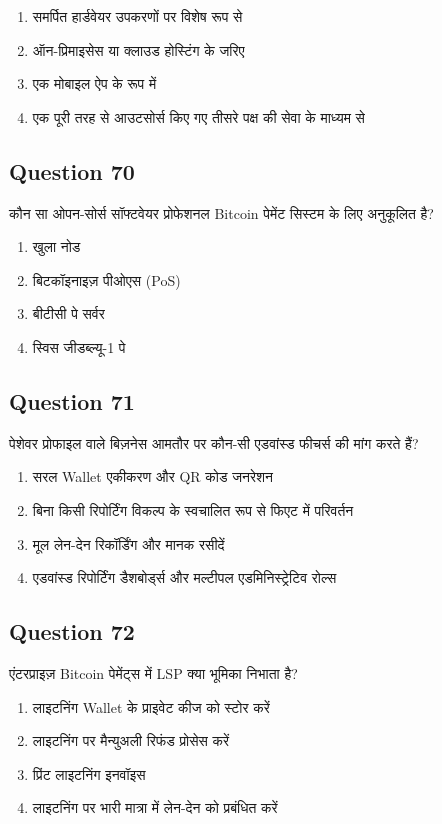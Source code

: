 \documentclass[12pt,a4paper]{article}
\begin{document}
\begin{enumerate}[label=\Alph*., leftmargin=*]
\item समर्पित हार्डवेयर उपकरणों पर विशेष रूप से
\item ऑन-प्रिमाइसेस या क्लाउड होस्टिंग के जरिए
\item एक मोबाइल ऐप के रूप में
\item एक पूरी तरह से आउटसोर्स किए गए तीसरे पक्ष की सेवा के माध्यम से
\end{enumerate}

\bigskip


\subsection*{Question 70}
कौन सा ओपन-सोर्स सॉफ्टवेयर प्रोफेशनल Bitcoin पेमेंट सिस्टम के लिए अनुकूलित है?

\begin{enumerate}[label=\Alph*., leftmargin=*]
\item खुला नोड
\item बिटकॉइनाइज़ पीओएस (PoS)
\item बीटीसी पे सर्वर
\item स्विस जीडब्ल्यू-1 पे
\end{enumerate}

\bigskip


\subsection*{Question 71}
पेशेवर प्रोफाइल वाले बिज़नेस आमतौर पर कौन-सी एडवांस्ड फीचर्स की मांग करते हैं?

\begin{enumerate}[label=\Alph*., leftmargin=*]
\item सरल Wallet एकीकरण और QR कोड जनरेशन
\item बिना किसी रिपोर्टिंग विकल्प के स्वचालित रूप से फिएट में परिवर्तन
\item मूल लेन-देन रिकॉर्डिंग और मानक रसीदें
\item एडवांस्ड रिपोर्टिंग डैशबोर्ड्स और मल्टीपल एडमिनिस्ट्रेटिव रोल्स
\end{enumerate}

\bigskip


\subsection*{Question 72}
एंटरप्राइज़ Bitcoin पेमेंट्स में LSP क्या भूमिका निभाता है?

\begin{enumerate}[label=\Alph*., leftmargin=*]
\item लाइटनिंग Wallet के प्राइवेट कीज को स्टोर करें
\item लाइटनिंग पर मैन्युअली रिफंड प्रोसेस करें
\item प्रिंट लाइटनिंग इनवॉइस
\item लाइटनिंग पर भारी मात्रा में लेन-देन को प्रबंधित करें
\end{enumerate}
\end{document}
